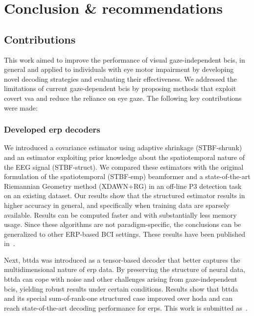 \chapter{Conclusion \& recommendations}

\section{Contributions}

This work aimed to improve the performance of visual gaze-independent \acsp{bci}, in general
and applied to individuals with eye motor impairment by developing novel decoding
strategies and evaluating their effectiveness.
We addressed the limitations of current gaze-dependent \acp{bci} by proposing methods that
exploit covert \ac{vsa} and reduce the reliance on eye gaze.
The following key contributions were made:

\subsection{Developed \acs{erp} decoders}
We introduced a covariance estimator using adaptive shrinkage (STBF-shrunk) and an estimator
exploiting prior knowledge about the spatiotemporal nature of the EEG signal
(STBF-struct).
We compared these estimators with the original formulation of the
spatiotemporal (STBF-emp)
beamformer and a state-of-the-art Riemannian Geometry method (XDAWN+RG) in an off-line P3 detection task on
an existing dataset.
Our results show that the structured estimator results in higher accuracy in
general, and specifically when training data are sparsely available.
Results can be computed faster and with
substantially less memory usage.
Since these algorithms are not paradigm-specific, the conclusions can be
generalized to other ERP-based BCI settings.
These results have been published in~\textcite{VanDenKerchove2022}.

Next, \acf{bttda} was introduced as a tensor-based decoder that better captures the
multidimensional nature of \ac{erp} data.
By preserving the structure of neural data, \ac{bttda} can cope with noise and other challenges
arising from gaze-independent \acp{bci}, yielding robust results under certain conditions.
Results show that \ac{bttda} and its special sum-of-rank-one structured case
improved over \ac{hoda} and can reach state-of-the-art decoding performance for
\acp{erp}.
This work is submitted as~\textcite{Vandenkerchove2024b}.

